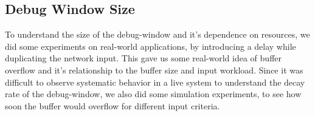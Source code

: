 \subsection{Debug Window Size}
\label{sec:parikshanTimewindowPerformance}

To understand the size of the debug-window and it's dependence on resources, we did some experiments on real-world applications, by introducing a delay while duplicating the network input.
This gave us some real-world idea of buffer overflow and it's relationship to the buffer size and input workload.
Since it was difficult to observe systematic behavior in a live system to understand the decay rate of the debug-window, we also did some simulation experiments, to see how soon the buffer would overflow for different input criteria.

